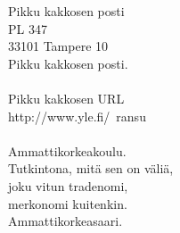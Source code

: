 
            Pikku kakkosen posti \\
            PL 347 \\
            33101 Tampere 10 \\
            Pikku kakkosen posti. \\
\hspace{10mm} \\
            Pikku kakkosen URL \\
            http://www.yle.fi/~ransu \\
\hspace{10mm} \\
            Ammattikorkeakoulu. \\
            Tutkintona, mitä sen on väliä, \\
            joku vitun tradenomi, \\
            merkonomi kuitenkin. \\
            Ammattikorkeasaari. \\
\hspace{10mm} \\

